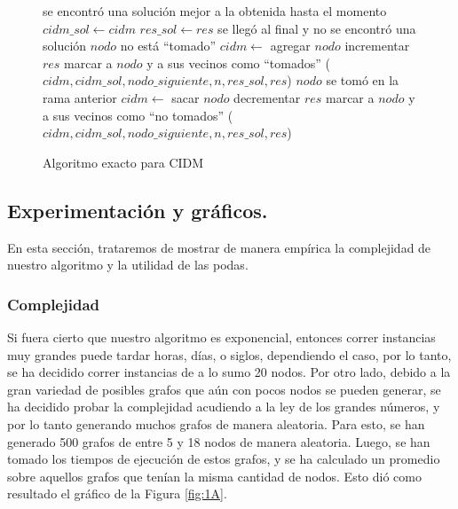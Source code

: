 \begin{figure}
\begin{codebox}
\li \If se encontró una solución mejor a la obtenida hasta el momento
\li \Then 
 		$cidm\_sol \leftarrow cidm$
\li 		$res\_sol \leftarrow res$ 		
\li 		\Return
	\End
\li \If se llegó al final y no se encontró una solución
\li \Then \Return
	\End
\li \If $nodo$ no está ``tomado''	
\li \Then
		$cidm \leftarrow$ agregar $nodo$
\li 		incrementar $res$
\li 		marcar a $nodo$ y a sus vecinos como ``tomados''
($cidm,cidm\_sol,nodo\_siguiente,n,res\_sol,res$)
	\End
\li 	\If $nodo$ se tomó en la rama anterior
\li 	\Then
		$cidm \leftarrow$ sacar $nodo$
\li		decrementar $res$
\li 		marcar a $nodo$ y a sus vecinos como ``no tomados''
	\End
{}($cidm,cidm\_sol,nodo\_siguiente,n,res\_sol,res$)
\end{codebox}
\caption{Algoritmo exacto para CIDM}\label{code:exacto}
\end{figure}

\vspace*{0.6cm}
\subsection{Experimentación y gráficos.}

\vspace*{0.3cm}

En esta sección, trataremos de mostrar de manera empírica la complejidad de nuestro algoritmo y la utilidad de las podas.

\subsubsection{Complejidad}

Si fuera cierto que nuestro algoritmo es exponencial, entonces correr instancias muy grandes puede tardar horas, días, o siglos, dependiendo el caso, por lo tanto, se ha decidido correr instancias de a lo sumo 20 nodos. Por otro lado, debido a la gran variedad de posibles grafos que aún con pocos nodos se pueden generar, se ha decidido probar la complejidad acudiendo a la ley de los grandes números, y por lo tanto generando muchos grafos de manera aleatoria. Para esto, se han generado 500 grafos de entre 5 y 18 nodos de manera aleatoria. Luego, se han tomado los tiempos de ejecución de estos grafos, y se ha calculado un promedio sobre aquellos grafos que tenían la misma cantidad de nodos. Esto dió como resultado el gráfico de la Figura \ref{fig:1A}.

